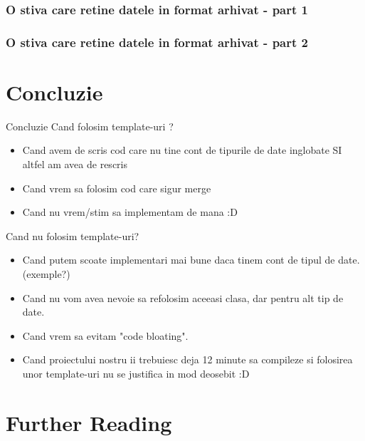 \documentclass{beamer}
\begin{document}
  \begin{frame}
  \frametitle{O stiva care retine datele in format arhivat - part 1}
  
  \end{frame}

  \begin{frame}
  \frametitle{O stiva care retine datele in format arhivat - part 2}
  
  \end{frame}

\section{Concluzie}
  
  \frame{\tableofcontents[currentsection]}
  
  \begin{frame}{Concluzie}
  Cand folosim template-uri ?
  \begin{itemize}
  \pause \item Cand avem de scris cod care nu tine cont de tipurile de date inglobate SI altfel am avea de rescris
  \pause \item Cand vrem sa folosim cod care sigur merge
  \pause \item Cand nu vrem/stim sa implementam de mana :D
  \end{itemize}
  \pause 
  Cand nu folosim template-uri?
  \begin{itemize}
  \pause \item Cand putem scoate implementari mai bune daca tinem cont de tipul de date. \pause (exemple?)
  \pause \item Cand nu vom avea nevoie sa refolosim aceeasi clasa, dar pentru alt tip de date.
  \pause \item Cand vrem sa evitam "code bloating".
  \pause \item Cand proiectului nostru ii trebuiesc deja 12 minute sa compileze si folosirea unor template-uri nu se justifica in mod deosebit :D
  \end{itemize}
  \end{frame}

\section{Further Reading}

  \frame{\tableofcontents[currentsection]}
\end{document}
